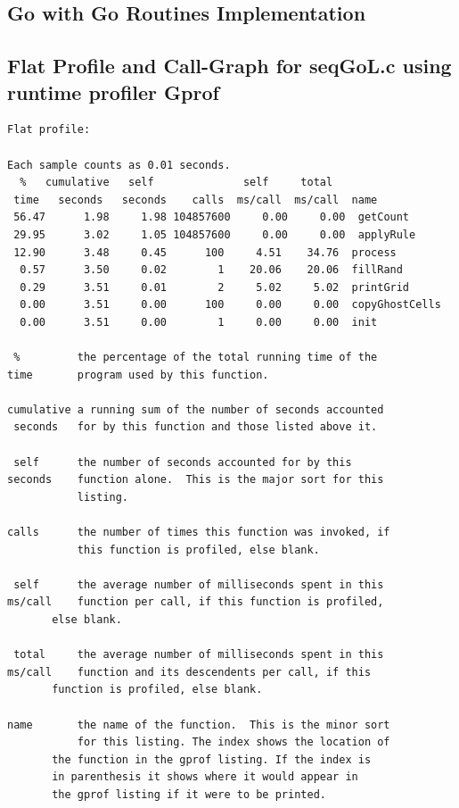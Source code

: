 \documentclass[11pt]{article} %
\begin{document}
\subsection{Go with Go Routines Implementation}

\pagebreak
\subsection{Flat Profile and Call-Graph for seqGoL.c using runtime profiler Gprof}
\begingroup
\fontsize{10pt}{8pt}
\begin{verbatim}
Flat profile:

Each sample counts as 0.01 seconds.
  %   cumulative   self              self     total           
 time   seconds   seconds    calls  ms/call  ms/call  name    
 56.47      1.98     1.98 104857600     0.00     0.00  getCount
 29.95      3.02     1.05 104857600     0.00     0.00  applyRule
 12.90      3.48     0.45      100     4.51    34.76  process
  0.57      3.50     0.02        1    20.06    20.06  fillRand
  0.29      3.51     0.01        2     5.02     5.02  printGrid
  0.00      3.51     0.00      100     0.00     0.00  copyGhostCells
  0.00      3.51     0.00        1     0.00     0.00  init

 %         the percentage of the total running time of the
time       program used by this function.

cumulative a running sum of the number of seconds accounted
 seconds   for by this function and those listed above it.

 self      the number of seconds accounted for by this
seconds    function alone.  This is the major sort for this
           listing.

calls      the number of times this function was invoked, if
           this function is profiled, else blank.
 
 self      the average number of milliseconds spent in this
ms/call    function per call, if this function is profiled,
	   else blank.

 total     the average number of milliseconds spent in this
ms/call    function and its descendents per call, if this 
	   function is profiled, else blank.

name       the name of the function.  This is the minor sort
           for this listing. The index shows the location of
	   the function in the gprof listing. If the index is
	   in parenthesis it shows where it would appear in
	   the gprof listing if it were to be printed.



\end{verbatim}
\end{document}
